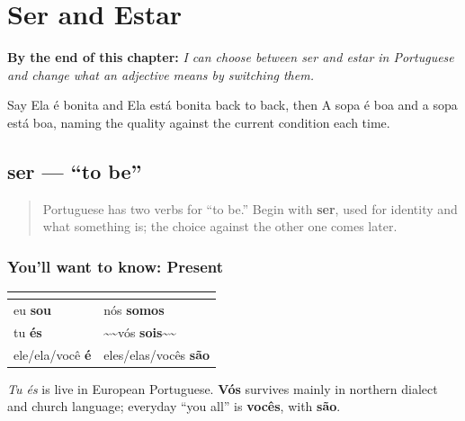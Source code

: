 
\chapter{Ser and Estar}
\label{ch:pt-ser-and-estar}

\begin{chapteropening}
\textbf{By the end of this chapter:} \emph{I can choose between ser and estar in Portuguese and change what an adjective means by switching them.}

Say Ela é bonita and Ela está bonita back to back, then A sopa é boa and a sopa está boa, naming the quality against the current condition each time.
\end{chapteropening}

\section[ser]{ser — “to be”}

\label{lesson:PT-C16-ser}



\begin{quote}
Portuguese has two verbs for “to be.” Begin with \textbf{ser}, used for identity and what something is; the choice against the other one comes later.
\end{quote}

\subsection*{You'll want to know: Present}
\noindent
\begin{tabularx}{\linewidth}{@{}>{\raggedright\arraybackslash}X>{\raggedright\arraybackslash}X@{}}
\toprule
\textbf{} & \textbf{} \\
\midrule
eu \textbf{sou} & nós \textbf{somos} \\
tu \textbf{és} & \textasciitilde{}\textasciitilde{}vós \textbf{sois}\textasciitilde{}\textasciitilde{} \\
ele/ela/você \textbf{é} & eles/elas/vocês \textbf{são} \\
\bottomrule
\end{tabularx}

\emph{Tu és} is live in European Portuguese. \textbf{Vós} survives mainly in northern dialect and church language; everyday “you all” is \textbf{vocês}, with \textbf{são}.


